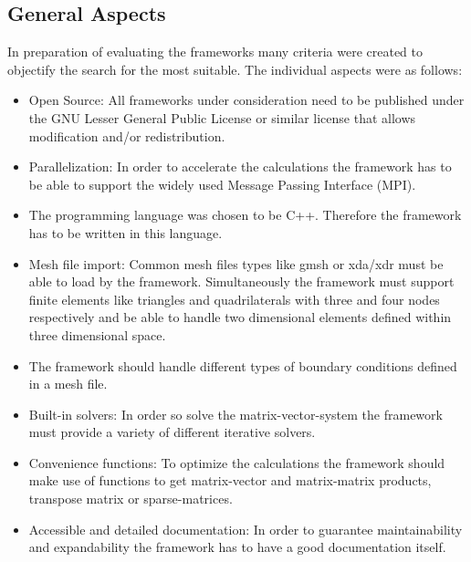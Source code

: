 \documentclass[11pt,twoside]{scrartcl}
\begin{document}
 \subsection{General Aspects}
In preparation of evaluating the frameworks many criteria were created to objectify the search for the most suitable. The individual aspects were as follows:
 \begin{itemize}
 \item Open Source: All frameworks under consideration need to be published under the GNU Lesser General Public License or similar license that allows modification and/or redistribution.
 \item Parallelization: In order to accelerate the calculations the framework has to be able to support the widely used Message Passing Interface (MPI).
 \item The programming language was chosen to be C++. Therefore the framework has to be written in this language. %
 \item Mesh file import: Common mesh files types like gmsh or xda/xdr must be able to load by the framework. Simultaneously the framework must support finite elements like triangles and quadrilaterals with three and four nodes respectively and be able to handle two dimensional elements defined within three dimensional space. %
 \item The framework should handle different types of boundary conditions defined in a mesh file. %
 \item Built-in solvers: In order so solve the matrix-vector-system the framework must provide a variety of different iterative solvers. %
 \item Convenience functions: To optimize the calculations the framework should make use of functions to get matrix-vector and matrix-matrix products, transpose matrix or sparse-matrices.
 \item Accessible and detailed documentation: In order to guarantee maintainability and expandability the framework has to have a good documentation itself. %

\end{itemize}
\end{document}
